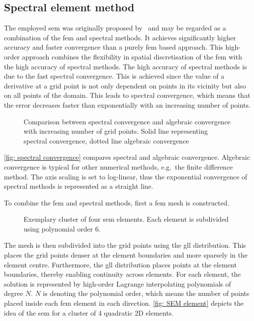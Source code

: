 \subsection{Spectral element method}
The employed \acrshort{sem} was originally proposed by~\cite{pateraSpectralElementMethod1984} and may be regarded as a combination of the \acrfull{fem} and spectral methods.
It achieves significantly higher accuracy and faster convergence than a purely \acrshort{fem} based approach. 
This high-order approach combines the flexibility in spatial discretisation of the \acrshort{fem} with the high accuracy of spectral methods.
The high accuracy of spectral methods is due to the fast spectral convergence.
This is achieved since the  value of a derivative at a grid point is not only dependent on points in its vicinity but also on all points of the domain.
This leads to spectral convergence, which means that the error decreases faster than exponentially with an increasing number of points.
\begin{figure}
    \centering
    \hspace{-1.6cm}
    
    \caption[Comparison between spectral convergence and algebraic convergence]{Comparison between spectral convergence and algebraic convergence with increasing number of grid points. Solid line representing spectral convergence, dotted line algebraic convergence}
    \label{fig: spectral convergence}
\end{figure}
\autoref{fig: spectral convergence} compares spectral and algebraic convergence. 
Algebraic convergence is typical for other numerical methods, e.g.\ the finite difference method.
The axis scaling is set to log-linear, thus the exponential convergence of spectral methods is represented as a straight line.

To combine the \acrshort{fem} and spectral methods, first a \acrshort{fem} mesh is constructed.
\begin{figure}
    \centering
    
    \caption[Visualisation of SEM element]{Exemplary cluster of four \acrshort{sem} elements. Each element is subdivided using polynomial order 6.}
    \label{fig: SEM element}
\end{figure}
The mesh is then subdivided into the grid points using the \acrfull{gll} distribution.
This places the grid points denser at the element boundaries and more sparsely in the element centre.
Furthermore, the \acrshort{gll} distribution places points at the element boundaries, thereby enabling continuity across elements.
For each element, the solution is represented by high-order Lagrange interpolating polynomials of degree $N$.
$N$ is denoting the polynomial order, which means the number of points placed inside each \acrshort{fem} element in each direction.
\autoref{fig: SEM element} depicts the idea of the \acrshort{sem} for a cluster of 4 quadratic 2D elements.

